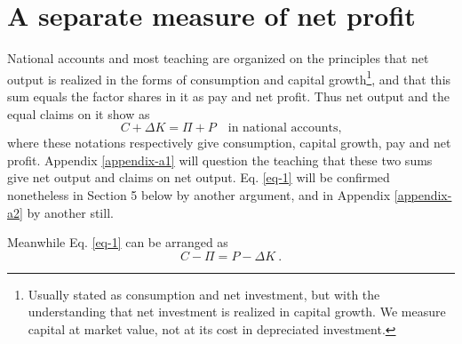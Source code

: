 \section{A separate measure of net profit}

National accounts and most teaching are organized on the principles that net output is realized in the forms of consumption and capital growth\footnote{Usually stated as consumption and net investment, but with the understanding that net investment is realized in capital growth. We measure capital at market value, not at its cost in depreciated investment.}, and that this sum equals the factor shares in it as pay and net profit. Thus net output and the equal claims on it show as
\begin{equation}
    C + \Delta K = \Pi + P \quad \text{in national accounts,} \label{eq-1}
\end{equation}
where these notations respectively give consumption, capital growth, pay and net profit. Appendix \ref{appendix-a1} will question the teaching that these two sums give net output and claims on net output. Eq. \eqref{eq-1} will be confirmed nonetheless in Section 5 below by another argument, and in Appendix \ref{appendix-a2} by another still.

Meanwhile Eq. \eqref{eq-1} can be arranged as
\begin{equation}
    C - \Pi = P - \Delta K \ . \label{eq-2}
\end{equation}

